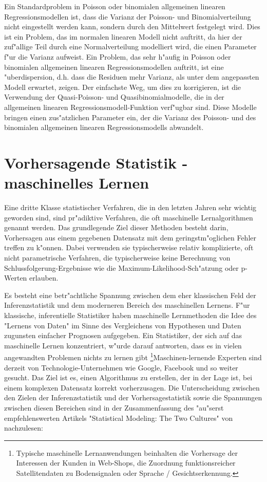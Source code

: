 \documentclass[a4paper,twoside]{tufte-book}\usepackage[]{graphicx}\usepackage[]{color}
\begin{document}
Ein Standardproblem in Poisson oder binomialen allgemeinen linearen Regressionsmodellen ist, dass die Varianz der Poisson- und Binomialverteilung nicht eingestellt werden kann, sondern durch den Mittelwert festgelegt wird. Dies ist ein Problem, das im normalen linearen Modell nicht auftritt, da hier der zuf"allige Teil durch eine Normalverteilung modelliert wird, die einen Parameter f"ur die Varianz aufweist. Ein Problem, das sehr h"aufig in Poisson oder binomialen allgemeinen linearen Regressionsmodellen auftritt, ist eine "uberdispersion, d.h. dass die Residuen mehr Varianz, als unter dem angepassten Modell erwartet, zeigen.  Der einfachste Weg, um dies zu korrigieren, ist die Verwendung der Quasi-Poisson- und Quasibinomialmodelle, die in der allgemeinen linearen Regressionsmodell-Funktion verf"ugbar sind. Diese Modelle bringen einen zus"atzlichen Parameter ein, der die Varianz des Poisson- und des binomialen allgemeinen linearen Regressionsmodells abwandelt.


\chapter{Vorhersagende Statistik - maschinelles Lernen}

Eine dritte Klasse statistischer Verfahren, die in den letzten Jahren sehr wichtig geworden sind, sind pr"adiktive Verfahren, die oft maschinelle Lernalgorithmen genannt werden. Das grundlegende Ziel dieser Methoden besteht darin, Vorhersagen aus einem gegebenen Datensatz mit dem geringstm"oglichen Fehler treffen zu k"onnen. Dabei verwenden sie typischerweise relativ komplizierte, oft nicht parametrische Verfahren, die typischerweise keine Berechnung von Schlussfolgerung-Ergebnisse wie die Maximum-Likelihood-Sch"atzung oder p-Werten erlauben.

Es besteht eine betr"achtliche Spannung zwischen dem eher klassischen Feld der Inferenzstatistik und dem moderneren Bereich des maschinellen Lernens. F"ur klassische, inferentielle Statistiker haben maschinelle Lernmethoden die Idee des "Lernens von Daten" im Sinne des Vergleichens von Hypothesen und Daten zugunsten einfacher Prognosen aufgegeben. Ein Statistiker, der sich auf das maschinelle Lernen konzentriert, w"urde darauf antworten, dass es in vielen angewandten Problemen nichts zu lernen gibt \footnote{Typische maschinelle Lernanwendungen beinhalten die Vorhersage der Interessen der Kunden in Web-Shops, die Zuordnung funktionsreicher Satellitendaten zu Bodensignalen oder Sprache / Gesichtserkennung.}Maschinen-lernende Experten sind derzeit von Technologie-Unternehmen wie Google, Facebook und so weiter gesucht. Das Ziel ist es, einen Algorithmus zu erstellen, der in der Lage ist, bei einem komplexen Datensatz korrekt vorherzusagen. Die Unterscheidung zwischen den Zielen der Inferenzstatistik und der Vorhersagestatistik sowie die Spannungen zwischen diesen Bereichen sind in der Zusammenfassung des "au"serst empfehlenswerten Artikels "Statistical Modeling: The Two Cultures" von \citet{Breiman-StatisticalModelingTwo-2001}nachzulesen:
\end{document}

